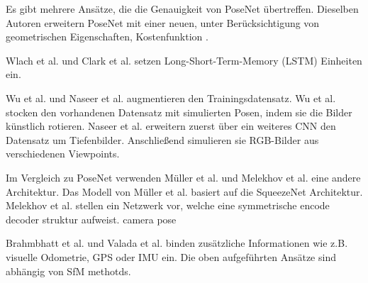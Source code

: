 Es gibt mehrere Ansätze, die die Genauigkeit von PoseNet übertreffen.
Dieselben Autoren erweitern PoseNet mit einer neuen, unter Berücksichtigung von geometrischen Eigenschaften, Kostenfunktion \cite{kendallGeometricLossFunctions2017}. 

Wlach et al. \cite{walchImagebasedLocalizationUsing2016} und Clark et al. \cite{clarkVidLocDeepSpatioTemporal2017} setzen Long-Short-Term-Memory (LSTM) \cite{hochreiterLongShortTermMemory1997a} Einheiten ein. 


Wu et al. \cite{wuDelvingDeeperConvolutional2017} und Naseer et al. \cite{naseerDeepRegressionMonocular2017} augmentieren den Trainingsdatensatz. 
Wu et al. \cite{wuDelvingDeeperConvolutional2017} stocken den vorhandenen Datensatz mit simulierten Posen, indem sie die Bilder künstlich rotieren. Naseer et al. \cite{naseerDeepRegressionMonocular2017} erweitern zuerst über ein weiteres CNN den Datensatz um Tiefenbilder. Anschließend simulieren sie RGB-Bilder aus verschiedenen Viewpoints.


Im Vergleich zu PoseNet verwenden Müller et al. \cite{mullerSQUEEZEPOSENETIMAGEBASED2017} und Melekhov et al.\cite{melekhovImageBasedLocalizationUsing2017} eine andere Architektur. 
Das Modell von Müller et al. \cite{mullerSQUEEZEPOSENETIMAGEBASED2017} basiert auf die SqueezeNet\cite{iandolaSqueezeNetAlexNetlevelAccuracy2016} Architektur. Melekhov et al.\cite{melekhovImageBasedLocalizationUsing2017} stellen ein Netzwerk vor, welche eine symmetrische encode decoder struktur aufweist.
camera pose

Brahmbhatt et al. \cite{brahmbhattGeometryAwareLearningMaps2018} und Valada et al. \cite{valadaDeepAuxiliaryLearning2018, valadaIncorporatingSemanticGeometric} binden zusätzliche Informationen wie z.B. visuelle Odometrie, GPS oder IMU ein.
Die oben aufgeführten Ansätze sind abhängig von SfM methotds.



% 

